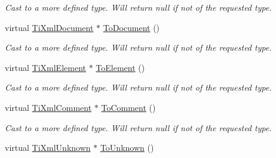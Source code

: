 \begin{DoxyCompactItemize}
\begin{DoxyCompactList}\small\item\em Cast to a more defined type. Will return null if not of the requested type. \item\end{DoxyCompactList}\item 
\hypertarget{class_ti_xml_node_a6a4c8ac28ee7a745d059db6691e03bae}{
virtual \hyperlink{class_ti_xml_document}{TiXmlDocument} $\ast$ \hyperlink{class_ti_xml_node_a6a4c8ac28ee7a745d059db6691e03bae}{ToDocument} ()}
\label{class_ti_xml_node_a6a4c8ac28ee7a745d059db6691e03bae}

\begin{DoxyCompactList}\small\item\em Cast to a more defined type. Will return null if not of the requested type. \item\end{DoxyCompactList}\item 
\hypertarget{class_ti_xml_node_aa65d000223187d22a4dcebd7479e9ebc}{
virtual \hyperlink{class_ti_xml_element}{TiXmlElement} $\ast$ \hyperlink{class_ti_xml_node_aa65d000223187d22a4dcebd7479e9ebc}{ToElement} ()}
\label{class_ti_xml_node_aa65d000223187d22a4dcebd7479e9ebc}

\begin{DoxyCompactList}\small\item\em Cast to a more defined type. Will return null if not of the requested type. \item\end{DoxyCompactList}\item 
\hypertarget{class_ti_xml_node_a383e06a0787f7063953934867990f849}{
virtual \hyperlink{class_ti_xml_comment}{TiXmlComment} $\ast$ \hyperlink{class_ti_xml_node_a383e06a0787f7063953934867990f849}{ToComment} ()}
\label{class_ti_xml_node_a383e06a0787f7063953934867990f849}

\begin{DoxyCompactList}\small\item\em Cast to a more defined type. Will return null if not of the requested type. \item\end{DoxyCompactList}\item 
\hypertarget{class_ti_xml_node_a06de5af852668c7e4af0d09c205f0b0d}{
virtual \hyperlink{class_ti_xml_unknown}{TiXmlUnknown} $\ast$ \hyperlink{class_ti_xml_node_a06de5af852668c7e4af0d09c205f0b0d}{ToUnknown} ()}
\label{class_ti_xml_node_a06de5af852668c7e4af0d09c205f0b0d}


\end{DoxyCompactItemize}
